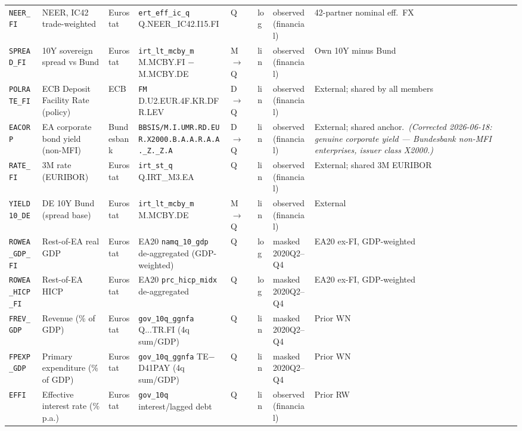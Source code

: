 {\begin{longtable}{@{}p{1.9cm}p{2.9cm}p{1.5cm}p{2.7cm}p{0.7cm}p{1.0cm}p{1.6cm}p{2.4cm}@{}}
\texttt{NEER\_FI}     & NEER, IC42 trade-weighted         & Eurostat & \texttt{ert\_eff\_ic\_q} Q.NEER\_IC42.I15.FI           & Q & log & observed (financial) & 42-partner nominal eff.\ FX \\
\texttt{SPREAD\_FI}   & 10Y sovereign spread vs Bund      & Eurostat & \texttt{irt\_lt\_mcby\_m} M.MCBY.FI $-$ M.MCBY.DE      & M$\to$Q & lin & observed (financial) & Own 10Y minus Bund \\
\texttt{POLRATE\_FI}  & ECB Deposit Facility Rate (policy) & ECB & \texttt{FM} D.\allowbreak U2.\allowbreak EUR.\allowbreak 4F.\allowbreak KR.\allowbreak DFR.\allowbreak LEV                     & D$\to$Q & lin & observed (financial) & External; shared by all members \\
\texttt{EACORP}       & EA corporate bond yield (non-MFI)  & Bundesbank & \texttt{BBSIS/\allowbreak M.\allowbreak I.\allowbreak UMR.\allowbreak RD.\allowbreak EUR.\allowbreak X2000.\allowbreak B.A.A.\allowbreak R.A.A.\allowbreak \_Z.\_Z.A}       & D$\to$Q & lin & observed (financial) & External; shared anchor.\ \textit{(Corrected 2026-06-18: genuine corporate yield --- Bundesbank non-MFI enterprises, issuer class X2000.)} \\
\texttt{RATE\_FI}     & 3M rate (EURIBOR)                 & Eurostat & \texttt{irt\_st\_q} Q.IRT\_M3.EA                       & Q & lin & observed (financial) & External; shared 3M EURIBOR \\
\texttt{YIELD10\_DE}  & DE 10Y Bund (spread base)         & Eurostat & \texttt{irt\_lt\_mcby\_m} M.MCBY.DE                    & M$\to$Q & lin & observed (financial) & External \\
\texttt{ROWEA\_GDP\_FI} & Rest-of-EA real GDP             & Eurostat & EA20 \texttt{namq\_10\_gdp} de-aggregated (GDP-weighted) & Q & log & masked 2020Q2--Q4 & EA20 ex-FI, GDP-weighted \\
\texttt{ROWEA\_HICP\_FI} & Rest-of-EA HICP               & Eurostat & EA20 \texttt{prc\_hicp\_midx} de-aggregated            & Q & log & masked 2020Q2--Q4 & EA20 ex-FI, GDP-weighted \\
\texttt{FREV\_GDP}    & Revenue (\% of GDP)               & Eurostat & \texttt{gov\_10q\_ggnfa} Q...TR.FI (4q sum/GDP)        & Q & lin & masked 2020Q2--Q4 & Prior WN \\
\texttt{FPEXP\_GDP}   & Primary expenditure (\% of GDP)   & Eurostat & \texttt{gov\_10q\_ggnfa} TE$-$D41PAY (4q sum/GDP)      & Q & lin & masked 2020Q2--Q4 & Prior WN \\
\texttt{EFFI}         & Effective interest rate (\% p.a.) & Eurostat & \texttt{gov\_10q} interest/lagged debt                 & Q & lin & observed (financial) & Prior RW \\

\end{longtable}}
